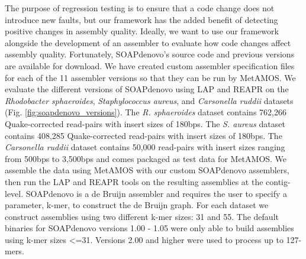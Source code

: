 The purpose of regression testing is to ensure that a code change does not introduce new faults, but our framework has the added benefit of detecting positive changes in assembly quality.
Ideally, we want to use our framework alongside the development of an assembler to evaluate how code changes affect assembly quality.
Fortunately, SOAPdenovo's source code and previous versions are available for download.
We have created custom assembler specification files for each of the 11 assembler versions so that they can be run by MetAMOS\cite{treangen2011metamos}.
We evaluate the different versions of SOAPdenovo using LAP and REAPR on the \emph{Rhodobacter sphaeroides}, \emph{Staphylococcus aureus}, and \emph{Carsonella ruddii} datasets (Fig. \ref{fig:soapdenovo_versions}).
The \emph{R. sphaeroides} dataset contains 762,266 Quake-corrected \cite{kelley2010quake} read-pairs with insert sizes of 180bps.
The \emph{S. aureus} dataset contains 408,285 Quake-corrected read-pairs with insert sizes of 180bps.
The \emph{Carsonella ruddii} dataset contains 50,000 read-pairs with insert sizes ranging from 500bps to 3,500bps and comes packaged as test data for MetAMOS.
We assemble the data using MetAMOS with our custom SOAPdenovo assemblers, then run the LAP and REAPR tools on the resulting assemblies at the contig-level.
SOAPdenovo is a de Bruijn assembler and requires the user to specify a parameter, k-mer, to construct the de Bruijn graph.
For each dataset we construct assemblies using two different k-mer sizes: 31 and 55.
The default binaries for SOAPdenovo versions 1.00 - 1.05 were only able to build assemblies using k-mer sizes <=31.
Versions 2.00 and higher were used to process up to 127-mers.


